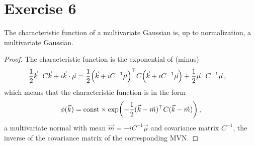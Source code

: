\documentclass[main.tex]{subfiles}
\begin{document}
\section*{Exercise 6}

\begin{claim}
The characteristic function of a multivariate Gaussian is, up to normalization, a multivariate Gaussian. 
\end{claim}

\begin{proof}
The characteristic function is the exponential of (minus) 
%
\begin{align}
\frac{1}{2} \vec{k}^{\top} C \vec{k} + i \vec{k} \cdot \vec{\mu} 
&=  \frac{1}{2} \qty(\vec{k} + i C^{-1} \vec{\mu })^{\top} C 
\qty(\vec{k} + iC^{-1}\vec{\mu }) + \frac{1}{2} \vec{\mu }^{\top} C^{-1} \vec{\mu }  
\,,
\end{align}
%
which means that the characteristic function is in the form 
%
\begin{align}
\phi (\vec{k}) = \text{const} \times \exp(- \frac{1}{2} (\vec{k} -\vec{m})^{\top} C (\vec{k} - \vec{m}) )
\,,
\end{align}
%
a multivariate normal with mean \(\vec{m} = -i C^{-1} \vec{\mu}\) and covariance matrix \(C^{-1}\), the inverse of the covariance matrix of the corresponding MVN.  
\end{proof}
\end{document}
